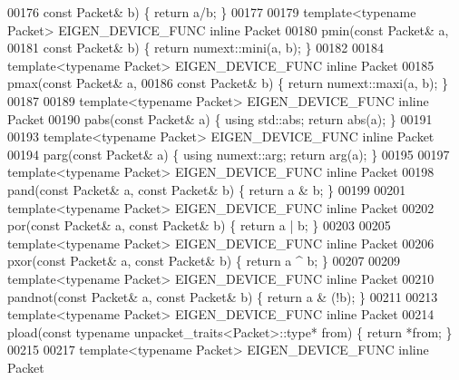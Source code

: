 \begin{DoxyCode}
00176         \textcolor{keyword}{const} Packet& b) \{ \textcolor{keywordflow}{return} a/b; \}
00177 
00179 \textcolor{keyword}{template}<\textcolor{keyword}{typename} Packet> EIGEN\_DEVICE\_FUNC \textcolor{keyword}{inline} Packet
00180 pmin(\textcolor{keyword}{const} Packet& a,
00181         \textcolor{keyword}{const} Packet& b) \{ \textcolor{keywordflow}{return} numext::mini(a, b); \}
00182 
00184 \textcolor{keyword}{template}<\textcolor{keyword}{typename} Packet> EIGEN\_DEVICE\_FUNC \textcolor{keyword}{inline} Packet
00185 pmax(\textcolor{keyword}{const} Packet& a,
00186         \textcolor{keyword}{const} Packet& b) \{ \textcolor{keywordflow}{return} numext::maxi(a, b); \}
00187 
00189 \textcolor{keyword}{template}<\textcolor{keyword}{typename} Packet> EIGEN\_DEVICE\_FUNC \textcolor{keyword}{inline} Packet
00190 pabs(\textcolor{keyword}{const} Packet& a) \{ \textcolor{keyword}{using} std::abs; \textcolor{keywordflow}{return} abs(a); \}
00191 
00193 \textcolor{keyword}{template}<\textcolor{keyword}{typename} Packet> EIGEN\_DEVICE\_FUNC \textcolor{keyword}{inline} Packet
00194 parg(\textcolor{keyword}{const} Packet& a) \{ \textcolor{keyword}{using} numext::arg; \textcolor{keywordflow}{return} arg(a); \}
00195 
00197 \textcolor{keyword}{template}<\textcolor{keyword}{typename} Packet> EIGEN\_DEVICE\_FUNC \textcolor{keyword}{inline} Packet
00198 pand(\textcolor{keyword}{const} Packet& a, \textcolor{keyword}{const} Packet& b) \{ \textcolor{keywordflow}{return} a & b; \}
00199 
00201 \textcolor{keyword}{template}<\textcolor{keyword}{typename} Packet> EIGEN\_DEVICE\_FUNC \textcolor{keyword}{inline} Packet
00202 por(\textcolor{keyword}{const} Packet& a, \textcolor{keyword}{const} Packet& b) \{ \textcolor{keywordflow}{return} a | b; \}
00203 
00205 \textcolor{keyword}{template}<\textcolor{keyword}{typename} Packet> EIGEN\_DEVICE\_FUNC \textcolor{keyword}{inline} Packet
00206 pxor(\textcolor{keyword}{const} Packet& a, \textcolor{keyword}{const} Packet& b) \{ \textcolor{keywordflow}{return} a ^ b; \}
00207 
00209 \textcolor{keyword}{template}<\textcolor{keyword}{typename} Packet> EIGEN\_DEVICE\_FUNC \textcolor{keyword}{inline} Packet
00210 pandnot(\textcolor{keyword}{const} Packet& a, \textcolor{keyword}{const} Packet& b) \{ \textcolor{keywordflow}{return} a & (!b); \}
00211 
00213 \textcolor{keyword}{template}<\textcolor{keyword}{typename} Packet> EIGEN\_DEVICE\_FUNC \textcolor{keyword}{inline} Packet
00214 pload(\textcolor{keyword}{const} \textcolor{keyword}{typename} unpacket\_traits<Packet>::type* from) \{ \textcolor{keywordflow}{return} *from; \}
00215 
00217 \textcolor{keyword}{template}<\textcolor{keyword}{typename} Packet> EIGEN\_DEVICE\_FUNC \textcolor{keyword}{inline} Packet

\end{DoxyCode}
